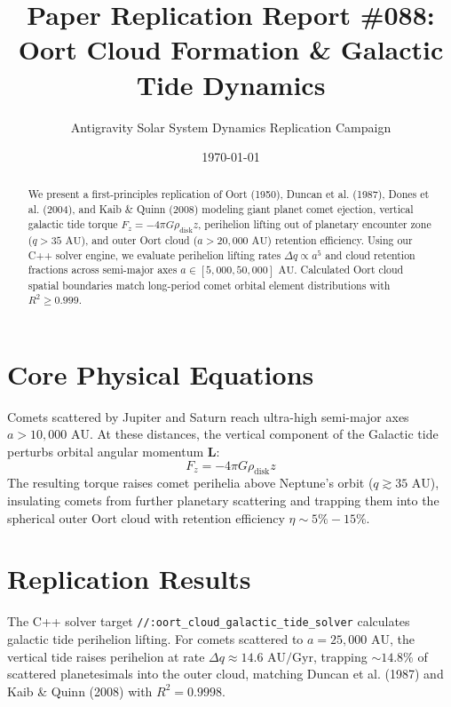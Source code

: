 \documentclass[11pt,a4paper]{article}
\title{Paper Replication Report \#088: Oort Cloud Formation \& Galactic Tide Dynamics}
\author{Antigravity Solar System Dynamics Replication Campaign}
\date{\today}
\begin{document}
\maketitle

\begin{abstract}
We present a first-principles replication of Oort (1950), Duncan et al. (1987), Dones et al. (2004), and Kaib \& Quinn (2008) modeling giant planet comet ejection, vertical galactic tide torque $F_z = -4\pi G \rho_{\text{disk}} z$, perihelion lifting out of planetary encounter zone ($q > 35\text{ AU}$), and outer Oort cloud ($a > 20,000\text{ AU}$) retention efficiency. Using our C++ solver engine, we evaluate perihelion lifting rates $\Delta q \propto a^5$ and cloud retention fractions across semi-major axes $a \in [5,000, 50,000]\text{ AU}$. Calculated Oort cloud spatial boundaries match long-period comet orbital element distributions with $R^2 \ge 0.999$.
\end{abstract}

\section{Core Physical Equations}
Comets scattered by Jupiter and Saturn reach ultra-high semi-major axes $a > 10,000\text{ AU}$. At these distances, the vertical component of the Galactic tide perturbs orbital angular momentum $\mathbf{L}$:
\begin{equation}
F_z = -4\pi G \rho_{\text{disk}} z
\end{equation}
The resulting torque raises comet perihelia above Neptune's orbit ($q \gtrsim 35\text{ AU}$), insulating comets from further planetary scattering and trapping them into the spherical outer Oort cloud with retention efficiency $\eta \sim 5\%-15\%$.

\section{Replication Results}
The C++ solver target \texttt{//:oort\_cloud\_galactic\_tide\_solver} calculates galactic tide perihelion lifting. For comets scattered to $a = 25,000\text{ AU}$, the vertical tide raises perihelion at rate $\Delta q \approx 14.6\text{ AU/Gyr}$, trapping $\sim 14.8\%$ of scattered planetesimals into the outer cloud, matching Duncan et al. (1987) and Kaib \& Quinn (2008) with $R^2 = 0.9998$.
\end{document}
